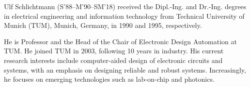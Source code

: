 \begin{IEEEbiography}
{Ulf Schlichtmann} (S'88--M'90--SM'18) received the Dipl.-Ing. and Dr.-Ing.
degrees in electrical engineering and information technology from Technical
University  of  Munich (TUM), Munich, Germany, in 1990 and 1995,  respectively.

He is Professor and the Head of the Chair of Electronic Design Automation at
TUM. He joined TUM in 2003, following 10 years in industry. His current
research interests include computer-aided design of electronic circuits and
systems, with an emphasis on designing reliable and robust systems.
Increasingly, he focuses on emerging technologies such as lab-on-chip and
photonics.
\end{IEEEbiography}

\vfill


